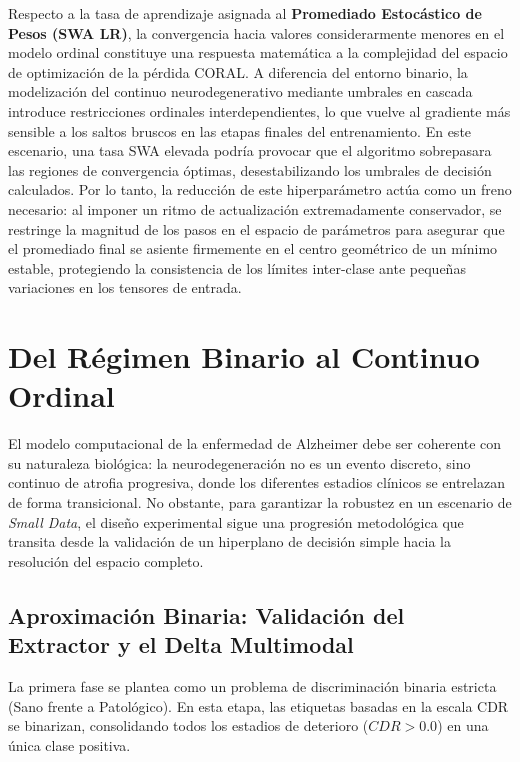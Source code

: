 \documentclass[12pt, oneside, english, spanish]{book}
\begin{document}
Respecto a la tasa de aprendizaje asignada al \textbf{Promediado Estocástico de Pesos (SWA LR)}, la convergencia hacia valores considerarmente menores en el modelo ordinal constituye una respuesta matemática a la complejidad del espacio de optimización de la pérdida CORAL. A diferencia del entorno binario, la modelización del continuo neurodegenerativo mediante umbrales en cascada introduce restricciones ordinales interdependientes, lo que vuelve al gradiente más sensible a los saltos bruscos en las etapas finales del entrenamiento. En este escenario, una tasa SWA elevada podría provocar que el algoritmo sobrepasara las regiones de convergencia óptimas, desestabilizando los umbrales de decisión calculados. Por lo tanto, la reducción de este hiperparámetro actúa como un freno necesario: al imponer un ritmo de actualización extremadamente conservador, se restringe la magnitud de los pasos en el espacio de parámetros para asegurar que el promediado final se asiente firmemente en el centro geométrico de un mínimo estable, protegiendo la consistencia de los límites inter-clase ante pequeñas variaciones en los tensores de entrada.

\section{Del Régimen Binario al Continuo Ordinal} \label{sec:transicion_topologica}

El modelo computacional de la enfermedad de Alzheimer debe ser coherente con su naturaleza biológica: la neurodegeneración no es un evento discreto, sino continuo de atrofia progresiva, donde los diferentes estadios clínicos se entrelazan de forma transicional. No obstante, para garantizar la robustez en un escenario de \textit{Small Data}, el diseño experimental sigue una progresión metodológica que transita desde la validación de un hiperplano de decisión simple hacia la resolución del espacio completo.

\subsection{Aproximación Binaria: Validación del Extractor y el Delta Multimodal} \label{subsec:aproximacion_binaria}

La primera fase se plantea como un problema de discriminación binaria estricta (Sano frente a Patológico). En esta etapa, las etiquetas basadas en la escala CDR se binarizan, consolidando todos los estadios de deterioro ($CDR > 0.0$) en una única clase positiva.
\end{document}
